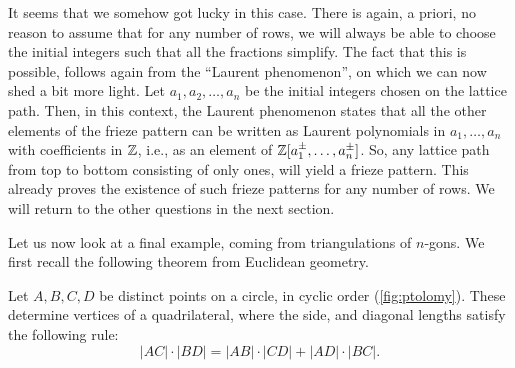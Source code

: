 It seems that we somehow got lucky in this case. There is again, a priori, no reason to
assume that for any number of rows, we will always be able to choose the initial
integers such that all the fractions simplify. The fact that this is possible, follows
again from the ``Laurent phenomenon'', on which we can now
shed a bit more light. Let $a_1, a_2, \dots, a_n$ be the initial integers chosen on the
lattice path. Then, in this context, the Laurent phenomenon states that all the other
elements of the frieze pattern can be written as Laurent
polynomials in $a_1 , \dots, a_n$ with coefficients in
$\mathbb{Z}$, i.e., as an element of $\mathbb{Z} [a_1 ^\pm, \dots, a_n^\pm]$. So, any lattice path
from top to bottom consisting of only ones, will yield a frieze pattern. This already
proves the existence of such frieze patterns for any number of rows. We will return to
the other questions in the next section.

Let us now look at a final example, coming from triangulations of $n$-gons. We first
recall the following theorem from Euclidean geometry.
\begin{theorem}
	Let $A,B,C,D$ be distinct points on a circle, in cyclic order (\cref{fig:ptolomy}).
	These determine vertices of a quadrilateral, where the side, and diagonal lengths
	satisfy the following rule:
	\begin{equation*}
		|AC| \cdot |BD| = |AB|\cdot |CD| + |AD| \cdot |BC|.
	\end{equation*}
\end{theorem}

